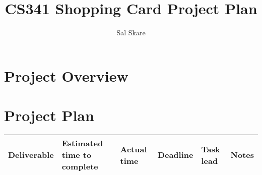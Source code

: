 \documentclass[10pt,letter]{article}
\begin{document}

\title{CS341 Shopping Card Project Plan}

\author{Sal Skare}

\maketitle 

\section*{Project Overview} 

\section*{Project Plan}
\begin{tabular}{l | l | l | l | l | l}
    \hline
    Deliverable & Estimated time to complete & Actual time & Deadline & Task lead & Notes \\

    \hline
\end{tabular}
\end{document}
